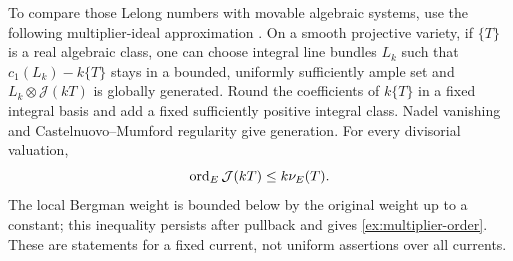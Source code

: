 To compare those Lelong numbers with movable algebraic systems, use
the following multiplier-ideal approximation
\cite[Theorems~5.11, 6.27, and 14.2]{Demailly2012}. On a smooth projective variety, if \(\{T\}\)
is a real algebraic class, one can choose integral line bundles
\(L_k\) such that \(c_1(L_k)-k\{T\}\) stays in a bounded,
uniformly sufficiently ample set and
\(L_k\otimes\mathcal J(kT)\) is globally generated. Round the
coefficients of \(k\{T\}\) in a fixed integral basis and add a
fixed sufficiently positive integral class. Nadel vanishing and
Castelnuovo--Mumford regularity give generation. For every
divisorial valuation,
\begin{equation}\label{ex:multiplier-order}
 \operatorname{ord}_E\mathcal J(kT)\leq k\nu_E(T).
\end{equation}
The local Bergman weight is bounded below by the original weight
up to a constant; this inequality persists after pullback and
gives \eqref{ex:multiplier-order}. These are statements for a
fixed current, not uniform assertions over all currents.

